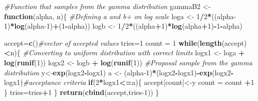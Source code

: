 \documentclass[
]{article}
\newenvironment{Shaded}{\begin{snugshade}}{\end{snugshade}}
\newcommand{\CommentTok}[1]{\textcolor[rgb]{0.56,0.35,0.01}{\textit{#1}}}
\newcommand{\ControlFlowTok}[1]{\textcolor[rgb]{0.13,0.29,0.53}{\textbf{#1}}}
\newcommand{\DecValTok}[1]{\textcolor[rgb]{0.00,0.00,0.81}{#1}}
\newcommand{\KeywordTok}[1]{\textcolor[rgb]{0.13,0.29,0.53}{\textbf{#1}}}
\newcommand{\NormalTok}[1]{#1}
\newcommand{\OperatorTok}[1]{\textcolor[rgb]{0.81,0.36,0.00}{\textbf{#1}}}
\newcommand{\StringTok}[1]{\textcolor[rgb]{0.31,0.60,0.02}{#1}}
\begin{document}
\begin{Shaded}
\begin{Highlighting}[]
\CommentTok{#Function that samples from the gamma distribution }
\NormalTok{gammaB2 <-}\StringTok{ }\ControlFlowTok{function}\NormalTok{(alpha, n)\{}
  \CommentTok{#Defining a and b+ on log scale}
\NormalTok{  loga <-}\StringTok{ }\DecValTok{1}\OperatorTok{/}\DecValTok{2}\OperatorTok{*}\NormalTok{((alpha}\DecValTok{-1}\NormalTok{)}\OperatorTok{*}\KeywordTok{log}\NormalTok{(alpha}\DecValTok{-1}\NormalTok{)}\OperatorTok{+}\NormalTok{(}\DecValTok{1}\OperatorTok{-}\NormalTok{alpha))}
\NormalTok{  logb <-}\StringTok{ }\DecValTok{1}\OperatorTok{/}\DecValTok{2}\OperatorTok{*}\NormalTok{((alpha}\OperatorTok{+}\DecValTok{1}\NormalTok{)}\OperatorTok{*}\KeywordTok{log}\NormalTok{(alpha}\OperatorTok{+}\DecValTok{1}\NormalTok{)}\OperatorTok{-}\DecValTok{1}\OperatorTok{-}\NormalTok{alpha)}
  
\NormalTok{  accept=}\KeywordTok{c}\NormalTok{()}\CommentTok{#vector of accepted values}
\NormalTok{  tries=}\DecValTok{1}
\NormalTok{  count =}\StringTok{ }\DecValTok{1}
  \ControlFlowTok{while}\NormalTok{(}\KeywordTok{length}\NormalTok{(accept)}\OperatorTok{<}\NormalTok{n)\{}
    \CommentTok{#Converting to uniform distribution with correct limits}
\NormalTok{    logx1 <-}\StringTok{ }\NormalTok{loga }\OperatorTok{+}\StringTok{ }\KeywordTok{log}\NormalTok{(}\KeywordTok{runif}\NormalTok{(}\DecValTok{1}\NormalTok{))}
\NormalTok{    logx2 <-}\StringTok{ }\NormalTok{logb }\OperatorTok{+}\StringTok{ }\KeywordTok{log}\NormalTok{(}\KeywordTok{runif}\NormalTok{(}\DecValTok{1}\NormalTok{))}
    \CommentTok{#Proposal sample from the gamma distribution}
\NormalTok{    y<-}\KeywordTok{exp}\NormalTok{(logx2}\OperatorTok{-}\NormalTok{logx1)}
\NormalTok{    a <-}\StringTok{ }\NormalTok{(alpha}\DecValTok{-1}\NormalTok{)}\OperatorTok{*}\NormalTok{(logx2}\OperatorTok{-}\NormalTok{logx1)}\OperatorTok{-}\KeywordTok{exp}\NormalTok{(logx2}\OperatorTok{-}\NormalTok{logx1)}\CommentTok{#acceptance criteria}
    \ControlFlowTok{if}\NormalTok{(}\DecValTok{2}\OperatorTok{*}\NormalTok{logx1}\OperatorTok{<=}\NormalTok{a)\{}
\NormalTok{      accept[count]<-y}
\NormalTok{      count =}\StringTok{ }\NormalTok{count }\OperatorTok{+}\DecValTok{1}
\NormalTok{    \}}
\NormalTok{    tries=tries}\OperatorTok{+}\DecValTok{1}
\NormalTok{  \}}
  \KeywordTok{return}\NormalTok{(}\KeywordTok{cbind}\NormalTok{(accept,tries}\DecValTok{-1}\NormalTok{))}
\NormalTok{\}}


\end{Highlighting}
\end{Shaded}
\end{document}
